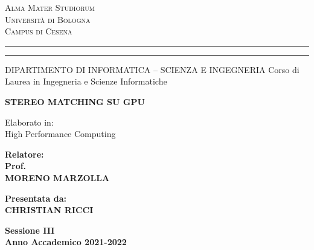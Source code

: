 \documentclass[12pt,a4paper,openright,twoside]{report}
\newcommand{\xstudent}{CHRISTIAN RICCI}
\newcommand{\xsupervisor}{MORENO MARZOLLA}
\begin{document}

\oddsidemargin=25pt

\begin{titlepage}
\begin{center}
    {\Large{\textsc{Alma Mater Studiorum}}}\\
    {\Large{\textsc{Universit\`a di Bologna}}} \\
    {\textsc{Campus di Cesena}}
    \rule[0.1cm]{14cm}{0.1mm}
    \rule[0.5cm]{14cm}{0.6mm}
    DIPARTIMENTO DI INFORMATICA – SCIENZA E INGEGNERIA
    Corso di Laurea in Ingegneria e Scienze Informatiche
\end{center}

\vspace{15mm}

\begin{center}
    {\LARGE{\bf STEREO MATCHING SU GPU}} \\
\end{center}

\vspace{15mm}

\begin{center}
     \large{ Elaborato in:\\ High Performance Computing\\}
\end{center}

\vspace{20mm}
\par
\noindent

\begin{minipage}[t]{0.47\textwidth}
    {\large{\bf Relatore:\\ Prof.\\ \xsupervisor}}
\end{minipage}
\hfill
\begin{minipage}[t]{0.47\textwidth}\raggedleft
    {\large{\bf Presentata da:\\ \xstudent}} \end{minipage}
\vspace{20mm}
\begin{center}
    \large{\bf Sessione III\\ Anno Accademico 2021-2022}
\end{center}

\clearpage{\pagestyle{empty}\cleardoublepage}
\end{titlepage}

\end{document}
